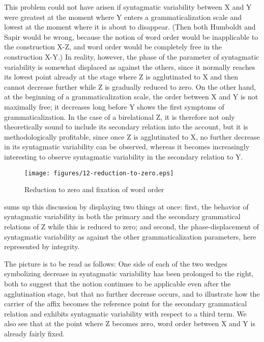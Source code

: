 This problem could not have arisen if syntagmatic variability between X and Y were greatest at the moment where Y enters a grammaticalization scale and lowest at the moment where it is about to disappear. (Then both Humboldt and Sapir would be wrong, because the notion of word order would be inapplicable to the construction X-Z, and word order would be completely free in the construction X-Y.) In reality, however, the phase of the parameter of syntagmatic variability is somewhat displaced as against the others, since it normally reaches its lowest point already at the stage where Z is agglutinated to X and then cannot decrease further while Z is gradually reduced to zero. On the other hand, at the beginning of a grammaticalization scale, the order between X and Y is not maximally free; it decreases long before Y shows the first symptoms of grammaticalization. In the case of a birelational Z, it is therefore not only theoretically sound to include its secondary relation into the account, but it is methodologically profitable, since once Z is agglutinated to X, no further decrease in its syntagmatic variability can be observed, whereas it becomes increasingly interesting to observe \enlargethispage{\baselineskip} syntagmatic variability in the secondary relation to Y.

\begin{figure}
\texttt{[image: figures/12-reduction-to-zero.eps]}
	
\caption{Reduction to zero and fixation of word order}\label{F12}
\end{figure}
 sums up this discussion by displaying two things at once: first, the behavior of syntagmatic variability in both the primary and the secondary grammatical relations of Z while this is reduced to zero; and second, the phase-displacement of syntagmatic variability as against the other grammaticalization parameters, here represented by integrity.

\enlargethispage{1\baselineskip}
The picture is to be read as follows: One side of each of the two wedges symbolizing decrease in syntagmatic variability has been prolonged to the right, both to suggest that the notion continues to be applicable even after the agglutination stage, but that no further decrease occurs, and to illustrate how the carrier of the affix becomes the reference point for the secondary grammatical relation and exhibits syntagmatic variability with respect to a third term. We also see that at the point where Z becomes zero, word order between X and Y is already fairly fixed.

